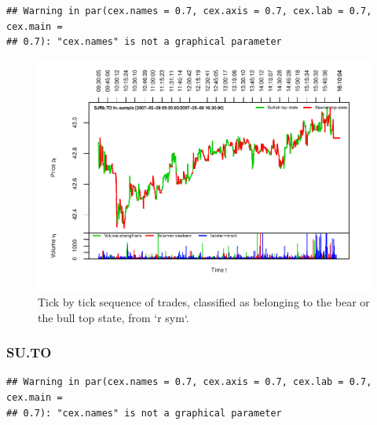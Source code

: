 \documentclass[]{article}
\begin{document}
\begin{verbatim}
## Warning in par(cex.names = 0.7, cex.axis = 0.7, cex.lab = 0.7, cex.main =
## 0.7): "cex.names" is not a graphical parameter
\end{verbatim}

\begin{figure}[H]
\includegraphics[width=\textwidth]{main_files/figure-latex/unnamed-chunk-42-1} \caption{Tick by tick sequence of trades, classified as belonging to the bear or the bull top state, from `r sym`.}\label{fig:unnamed-chunk-42}
\end{figure}

\newpage

\subsubsection{SU.TO}\label{su.to}

\begin{verbatim}
## Warning in par(cex.names = 0.7, cex.axis = 0.7, cex.lab = 0.7, cex.main =
## 0.7): "cex.names" is not a graphical parameter
\end{verbatim}
\end{document}
